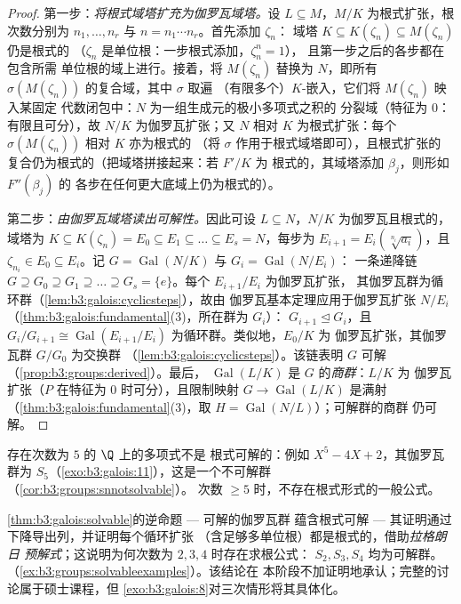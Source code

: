 \begin{proof}
第一步：\emph{将根式域塔扩充为伽罗瓦域塔。}设 $L
\subseteq M$，$M/K$ 为根式扩张，根次数分别为 $n_1, \dots,
n_r$ 与 $n = n_1\cdots n_r$。首先添加 $\zeta_n$：
域塔 $K \subseteq K(\zeta_n) \subseteq M(\zeta_n)$ 仍是根式的
（$\zeta_n$ 是单位根：一步根式添加，$\zeta_n^n = 1$），
且第一步之后的各步都在包含所需
单位根的域上进行。接着，将 $M(\zeta_n)$ 替换为
$N$，即所有 $\sigma(M(\zeta_n))$ 的复合域，其中 $\sigma$ 取遍
（有限多个）$K$-嵌入，它们将 $M(\zeta_n)$ 映入某固定
代数闭包中：$N$ 为一组生成元的极小多项式之积的
分裂域（特征为 $0$：
有限且可分），故 $N/K$ 为伽罗瓦扩张；又 $N$
相对 $K$ 为根式扩张：每个 $\sigma(M(\zeta_n))$ 相对 $K$ 亦为根式的
（将 $\sigma$ 作用于根式域塔即可），且根式扩张的
复合仍为根式的（把域塔拼接起来：若 $F'/K$ 为
根式的，其域塔添加 $\beta_j$，则形如 $F''(\beta_j)$ 的
各步在任何更大底域上仍为根式的）。

第二步：\emph{由伽罗瓦域塔读出可解性。}因此可设
$L \subseteq N$，$N/K$ 为伽罗瓦且根式的，域塔为 $K
\subseteq K(\zeta_n) = E_0 \subseteq E_1 \subseteq \dots
\subseteq E_s = N$，每步为 $E_{i+1} = E_i(\sqrt[n_i]{a_i})$，且
$\zeta_{n_i} \in E_0 \subseteq E_i$。记 $G =
\operatorname{Gal}(N/K)$ 与 $G_i = \operatorname{Gal}(N/E_i)$：
一条递降链 $G \supseteq G_0 \supseteq G_1 \supseteq
\dots \supseteq G_s = \{e\}$。每个 $E_{i+1}/E_i$ 为伽罗瓦扩张，
其伽罗瓦群为循环群（\cref{lem:b3:galois:cyclicsteps}），故由
伽罗瓦基本定理应用于伽罗瓦扩张 $N/E_i$
（\cref{thm:b3:galois:fundamental}(3)，所在群为 $G_i$）：
$G_{i+1} \trianglelefteq G_i$，且 $G_i/G_{i+1} \cong
\operatorname{Gal}(E_{i+1}/E_i)$ 为循环群。类似地，$E_0/K$ 为
伽罗瓦扩张，其伽罗瓦群 $G/G_0$ 为交换群
（\cref{lem:b3:galois:cyclicsteps}）。该链表明 $G$
可解（\cref{prop:b3:groups:derived}）。最后，
$\operatorname{Gal}(L/K)$ 是 $G$ 的\emph{商群}：$L/K$ 为
伽罗瓦扩张（$P$ 在特征为 $0$ 时可分），且限制映射 $G
\to \operatorname{Gal}(L/K)$ 是满射
（\cref{thm:b3:galois:fundamental}(3)，取 $H =
\operatorname{Gal}(N/L)$）；可解群的商群
仍可解。
\end{proof}

\begin{corollary}[五次方程的不可解性]
\label{cor:b3:galois:quintic}
存在次数为 $5$ 的 $\Q$ 上的多项式不是
根式可解的：例如 $X^5 - 4X + 2$，其伽罗瓦群为
$S_5$（\cref{exo:b3:galois:11}），这是一个不可解群
（\cref{cor:b3:groups:snnotsolvable}）。
次数 $\geq 5$ 时，不存在根式形式的一般公式。
\end{corollary}

\begin{remark}\label{rem:b3:galois:converse}
\cref{thm:b3:galois:solvable}的逆命题 --- 可解的伽罗瓦群
蕴含根式可解 --- 其证明通过
下降导出列，并证明每个循环扩张
（含足够多单位根）都是根式的，借助\emph{拉格朗日
预解式}；这说明为何次数为 $2, 3, 4$ 时存在求根公式：
$S_2, S_3, S_4$ 均为可解群。
（\cref{ex:b3:groups:solvableexamples}）。该结论在
本阶段不加证明地承认；完整的讨论属于硕士课程，但
\cref{exo:b3:galois:8}对三次情形将其具体化。
\end{remark}

